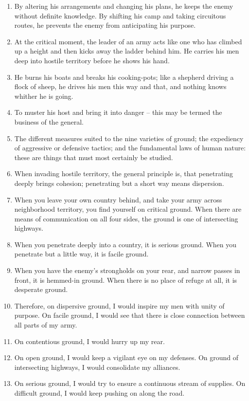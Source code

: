 \documentclass[oneside]{book}
\begin{document}
\begin{enumerate}
	\item By altering his arrangements and changing his plans, he keeps the enemy without definite knowledge. By shifting his camp and taking circuitous routes, he prevents the enemy from anticipating his purpose.
	\item At the critical moment, the leader of an army acts like one who has climbed up a height and then kicks away the ladder behind him. He carries his men deep into hostile territory before he shows his hand.
	\item He burns his boats and breaks his cooking-pots; like a shepherd driving a flock of sheep, he drives his men this way and that, and nothing knows whither he is going.
	\item To muster his host and bring it into danger – this may be termed the business of the general.
	\item The different measures suited to the nine varieties of ground; the expediency of aggressive or defensive tactics; and the fundamental laws of human nature: these are things that must most certainly be studied.
	\item When invading hostile territory, the general principle is, that penetrating deeply brings cohesion; penetrating but a short way means dispersion.
	\item When you leave your own country behind, and take your army across neighborhood territory, you find yourself on critical ground. When there are means of communication on all four sides, the ground is one of intersecting highways.
	\item When you penetrate deeply into a country, it is serious ground. When you penetrate but a little way, it is facile ground.
	\item When you have the enemy's strongholds on your rear, and narrow passes in front, it is hemmed-in ground. When there is no place of refuge at all, it is desperate ground.
	\item Therefore, on dispersive ground, I would inspire my men with unity of purpose. On facile ground, I would see that there is close connection between all parts of my army.
	\item On contentious ground, I would hurry up my rear.
	\item On open ground, I would keep a vigilant eye on my defenses. On ground of intersecting highways, I would consolidate my alliances.
	\item On serious ground, I would try to ensure a continuous stream of supplies. On difficult ground, I would keep pushing on along the road.

\end{enumerate}
\end{document}
